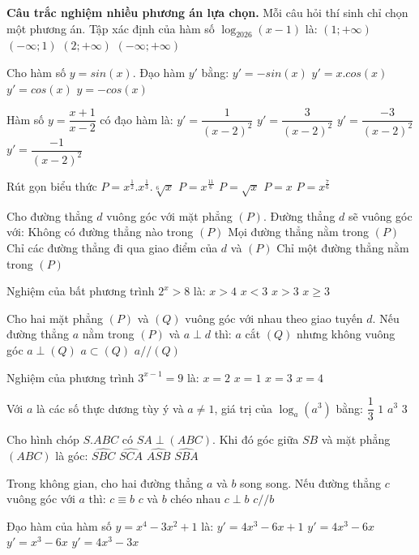 \documentclass{article}
\begin{document}
\begin{khuvuc}{\textbf{Câu trắc nghiệm nhiều phương án lựa chọn.} Mỗi câu hỏi thí sinh chỉ chọn một phương án.}
    \CauTracNghiem
    {Tập xác định của hàm số $\log_{2026}{(x-1)}$ là:}
    {\Dung $\left(1;+\infty \right)$}
    {$\left(-\infty;1 \right)$}
    {$\left(2;+\infty \right)$}
    {$\left(-\infty;+\infty \right)$}

    \CauTracNghiem
    {Cho hàm số $y=sin(x)$. Đạo hàm $y'$ bằng: }
    {$y'=-sin(x)$}
    {$y'=x.cos(x)$}
    {\Dung $y'=cos(x)$}
    {$y=-cos(x)$}

    \CauTracNghiem
    {Hàm số $y=\dfrac{x+1}{x-2}$ có đạo hàm là: }
    {$y'=\dfrac{1}{(x-2)^2}$}
    {$y'=\dfrac{3}{(x-2)^2}$}
    {\Dung $y'=\dfrac{-3}{(x-2)^2}$}
    {$y'=\dfrac{-1}{(x-2)^2}$}

    \CauTracNghiem
    {Rút gọn biểu thức $P=x^\frac{1}{2}.x^\frac{1}{3}.\sqrt[6]{x}$}
    {$P=x^\frac{11}{6}$}
    {$P=\sqrt{x}$}
    {\Dung $P=x$}
    {$P=x^\frac{7}{6}$}

    \CauTracNghiem
    {Cho đường thẳng $d$ vuông góc với mặt phẳng $(P)$. Đường thẳng $d$ sẽ vuông góc với:}
    {Không có đường thẳng nào trong $(P)$}
    {\Dung Mọi đường thẳng nằm trong $(P)$}
    {Chỉ các đường thẳng đi qua giao điểm của $d$ và $(P)$}
    {Chỉ một đường thẳng nằm trong $(P)$}

    \CauTracNghiem
    {Nghiệm của bất phương trình $2^x > 8$ là:}
    {$x>4$}
    {$x<3$}
    {\Dung $x>3$}
    {$x\geq3$}

    \CauTracNghiem
    {Cho hai mặt phẳng $(P)$ và $(Q)$ vuông góc với nhau theo giao tuyến $d$.
        Nếu đường thẳng $a$ nằm trong $(P)$ và $a \perp d$ thì:}
    {$a$ cắt $(Q)$ nhưng không vuông góc}
    {\Dung $a \perp (Q)$}
    {$a \subset (Q)$}
    {$a // (Q)$}

    \CauTracNghiem
    {Nghiệm của phương trình $3^{x-1}=9$ là:}
    {$x=2$}
    {$x=1$}
    {\Dung $x=3$}
    {$x=4$}

    \CauTracNghiem
    {Với $a$ là các số thực dương tùy ý và $a \neq 1$, giá trị của $\log_a(a^3)$ bằng:}
    {$\dfrac{1}{3}$}
    {$1$}
    {$a^3$}
    {\Dung $3$}

    \CauTracNghiem
    {Cho hình chóp $S.ABC$ có $SA \perp (ABC)$. Khi đó góc giữa $SB$ và mặt phẳng $(ABC)$ là góc:}
    {$\widehat{SBC}$}
    {$\widehat{SCA}$}
    {$\widehat{ASB}$}
    {\Dung $\widehat{SBA}$}

    \CauTracNghiem
    {Trong không gian, cho hai đường thẳng $a$ và $b$ song song. Nếu đường thẳng $c$ vuông góc với $a$ thì:}
    {$c \equiv b$}
    {$c$ và $b$ chéo nhau}
    {\Dung $c \perp b$}
    {$c // b$}

    \CauTracNghiem
    {Đạo hàm của hàm số $y=x^4-3x^2+1$ là:}
    {$y'=4x^3-6x+1$}
    {\Dung $y'=4x^3-6x$}
    {$y'=x^3-6x$}
    {$y'=4x^3-3x$}

\end{khuvuc}
\end{document}
